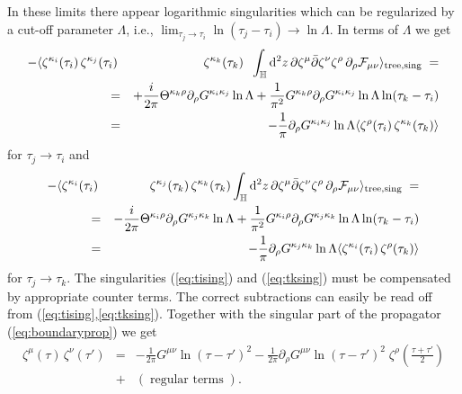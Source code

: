 \documentclass[a4paper,12pt]{article}
\let\bra=\langle        \let\ket=\rangle
\newcommand {\ud} {\mathrm{d}}
\newcommand {\cF} {{\cal F}}
\newcommand {\bbH}{\mathbb{H}}
\newcommand {\Back}{\!\!\!\!\!}
\begin{document}
In these limits there appear logarithmic singularities
which can be regularized by a cut-off parameter $\Lambda$, i.e., 
$\lim _{\tau_j \rightarrow \tau_i} \ln (\tau_j - \tau_i) \rightarrow 
\ln \Lambda$. In terms of $\Lambda$ we get
\begin{eqnarray}
  \label{eq:tising}
   - \bra\zeta^{\kappa_i}(\tau_i)\,\zeta^{\kappa_j}(\tau_i)
       \Back & & \Back \zeta^{\kappa_k}(\tau_k) \;\;
       \int _\bbH \ud^2z \, 
       \partial \zeta^\mu \bar\partial \zeta^\nu \zeta^\rho \, 
       \partial_\rho \cF_{\mu\nu}\ket_{\mathrm{tree, sing}} \; = \nonumber \\  
   &=& +\frac {i}{2\pi} \Theta^{\kappa_k \rho} 
                     \partial_\rho G^{\kappa_i \kappa_j}
                     \ln \Lambda
       +\frac{1}{\pi^2} G^{\kappa_k \rho} 
                     \partial_\rho G^{\kappa_i \kappa_j}
                     \ln \Lambda \ln (\tau_k - \tau_i) \nonumber \\
   &=& - \frac {1}{\pi} \partial_\rho G^{\kappa_i \kappa_j} 
                               \ln \Lambda
       \bra\zeta^\rho(\tau_i)\,\zeta^{\kappa_k}(\tau_k)\ket
\end{eqnarray}
for $\tau_j \rightarrow \tau_i$ and 
\begin{eqnarray}
  \label{eq:tksing}
   - \bra\zeta^{\kappa_i}(\tau_i)\Back & & \Back
      \zeta^{\kappa_j}(\tau_k)\,\zeta^{\kappa_k}(\tau_k)
      \int _\bbH \ud^2z \, 
      \partial \zeta^\mu \bar\partial \zeta^\nu \zeta^\rho \, 
      \partial_\rho \cF_{\mu\nu}\ket_{\mathrm{tree, sing}} \; = \nonumber \\  
   &=& -\frac {i}{2\pi} \Theta^{\kappa_i \rho} 
                     \partial_\rho G^{\kappa_j \kappa_k}
                     \ln \Lambda
       +\frac{1}{\pi^2} G^{\kappa_i \rho} 
                     \partial_\rho G^{\kappa_j \kappa_k}
                     \ln \Lambda \ln (\tau_k - \tau_i)\nonumber \\
   &=&  - \frac {1}{\pi} \partial_\rho G^{\kappa_j \kappa_k} 
                               \ln \Lambda
       \bra\zeta^{\kappa_i}(\tau_i)\,\zeta^\rho(\tau_k)\ket      
\end{eqnarray}
for $\tau_j \rightarrow \tau_k$.
The singularities (\ref{eq:tising}) and (\ref{eq:tksing})
must be compensated by
appropriate counter terms.
The correct subtractions 
can easily be read off from (\ref{eq:tising},\ref{eq:tksing}). 
Together with the singular part of the propagator (\ref{eq:boundaryprop}) 
we get
\begin{eqnarray}
  \label{eq:ope}
  \zeta^\mu (\tau) \, \zeta^\nu (\tau')  &=& 
      - \frac {1}{2\pi} G^{\mu\nu} \ln(\tau-\tau')^2
      - \frac {1}{2\pi} 
        \partial_\rho G^{\mu \nu} \ln(\tau-\tau')^2 \; 
        \zeta^\rho (\frac {\tau+\tau'}{2}) \nonumber \\
  &+& ( \; \textrm{regular terms} \; ) .
\end{eqnarray}
\end{document}
